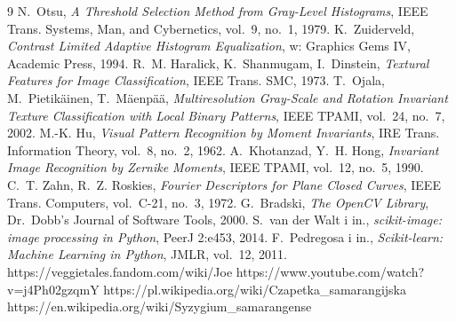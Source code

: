 \documentclass[10pt,a4paper]{article}
\begin{document}
\begin{thebibliography}{9}
\small
{} N.~Otsu, \emph{A Threshold Selection Method from Gray-Level
  Histograms}, IEEE Trans. Systems, Man, and Cybernetics, vol.~9, no.~1, 1979.
 K.~Zuiderveld, \emph{Contrast Limited Adaptive Histogram
  Equalization}, w: Graphics Gems IV, Academic Press, 1994.
 R.~M. Haralick, K.~Shanmugam, I.~Dinstein,
  \emph{Textural Features for Image Classification}, IEEE Trans. SMC, 1973.
 T.~Ojala, M.~Pietik\"ainen, T.~M\"aenp\"a\"a, \emph{Multiresolution
  Gray-Scale and Rotation Invariant Texture Classification with Local Binary
  Patterns}, IEEE TPAMI, vol.~24, no.~7, 2002.
 M.-K. Hu, \emph{Visual Pattern Recognition by Moment Invariants},
  IRE Trans. Information Theory, vol.~8, no.~2, 1962.
 A.~Khotanzad, Y.~H. Hong, \emph{Invariant Image Recognition
  by Zernike Moments}, IEEE TPAMI, vol.~12, no.~5, 1990.
 C.~T. Zahn, R.~Z. Roskies, \emph{Fourier Descriptors for
  Plane Closed Curves}, IEEE Trans. Computers, vol.~C-21, no.~3, 1972.
 G.~Bradski, \emph{The OpenCV Library}, Dr.~Dobb's Journal of
  Software Tools, 2000.
 S.~van der Walt i in., \emph{scikit-image: image processing
  in Python}, PeerJ 2:e453, 2014.
 F.~Pedregosa i in., \emph{Scikit-learn: Machine Learning in
  Python}, JMLR, vol.~12, 2011.
 https://veggietales.fandom.com/wiki/Joe
 https://www.youtube.com/watch?v=j4Ph02gzqmY
 https://pl.wikipedia.org/wiki/Czapetka\_samarangijska
 https://en.wikipedia.org/wiki/Syzygium\_samarangense
\end{thebibliography}
\end{document}
